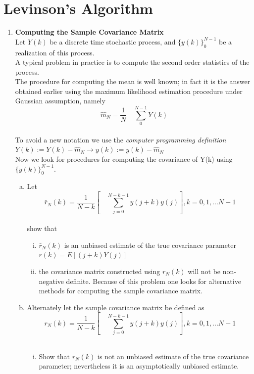 \documentclass[journal,12pt,twocolumn]{IEEEtran}
\begin{document}
\section{Levinson's Algorithm}
\begin{enumerate}
\item\textbf{Computing the Sample Covariance Matrix}\\
\smallskip
Let $Y(k)$ be a discrete time stochastic process, and $\{y(k)\}_0^{N-1}$ be a realization of this process.\\

A typical problem in practice is to compute the second order statistics of the process.\\
\smallskip
The procedure for computing the mean is well known; in fact it is the answer obtained earlier
using the maximum likelihood estimation procedure under Gaussian assumption, namely
\bigskip
\bigskip
$$\hat{m}_N=\frac{1}{N}\quad\sum_0^{N-1}Y(k)$$\\
\bigskip
To avoid a new notation we use the \textit{computer programming definition}\\
\bigskip
\bigskip
$Y(k):=Y(k)-\hat{m}_N\rightarrow y(k):=y(k)-\hat{m}_N$\\
\bigskip
Now we look for procedures for computing the covariance of Y(k) using $\{y(k)\}_0^{N-1}.$
\begin{enumerate}[(a)]
\item Let\\
\bigskip
$$\bar{r}_N{(k)}=\frac{1}{N-k}[{\quad\sum_{j=0}^{N-k-1}}{y(j+k)}y(j)], k=0,1,...N-1 $$\\
show that\\
\begin{enumerate}[i.]
\item $\bar{r}_N{(k)}$ is an unbiased estimate of the true covariance parameter $r(k)=E[(j+k)Y(j)]$
\item the covariance matrix constructed using $r_N{(k)}$ will not be non-negative definite. Because of this problem one looks for alternative methods for computing the sample
covariance matrix.
\end{enumerate}
\item Alternately let the sample covariance matrix be defined as
$$r_N{(k)}=\frac{1}{N-k}[{\quad\sum_{j=0}^{N-k-1}}{y(j+k)}y(j)], k=0,1,...N-1 $$\\
\begin{enumerate}[i.]
\item Show that $r_N{(k)}$ is not an unbiased estimate of the true covariance parameter; nevertheless it is an asymptotically unbiased estimate.

\end{enumerate}
\end{enumerate}
\end{enumerate}
\end{document}
